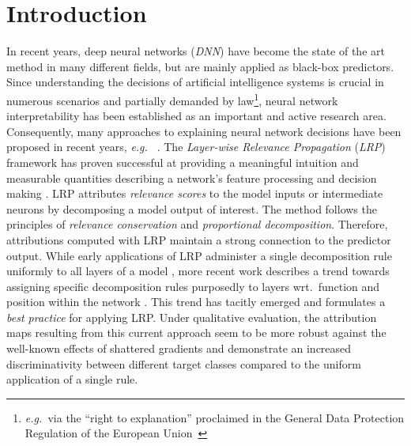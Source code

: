 \documentclass[conference]{IEEEtran}
\def\eg{\emph{e.g.~}}
\def\wrt{wrt.~}
\begin{document}
\section{Introduction}
In recent years, deep neural networks (\emph{DNN}) have become the state of the art method in many different fields,
but are mainly applied as black-box predictors.
Since understanding the decisions of artificial intelligence systems is crucial in numerous scenarios and partially demanded by law\footnote{\eg via the ``right to explanation'' proclaimed in the General Data Protection Regulation of the European Union~\cite{GDPR2016,goodman2016european}},
neural network interpretability has been established as an important and active research area.
Consequently, many approaches to explaining neural network decisions have been proposed in recent years,
\eg
\cite{springenberg2014striving,kindermans2017learning,sundararajan2017axiomatic,smilkov2017smoothgrad}.
The \emph{Layer-wise Relevance Propagation} (\emph{LRP}) \cite{bach2015pixel} framework has proven successful at providing a meaningful intuition and measurable quantities describing a network's feature processing and decision making
\cite{yang2018explaining, thomas2018analyzing,lapuschkin2019unmasking}.
LRP attributes \emph{relevance scores}  to the model inputs or intermediate neurons  by decomposing a model output of interest.
The method follows the principles of \emph{relevance conservation} and \emph{proportional decomposition}.
Therefore, attributions computed with LRP maintain a strong connection to the predictor output.
While early applications of LRP administer a single decomposition rule uniformly to all layers of a model
\cite{bach2015pixel,lapuschkin2016analyzing, ancona2019gradient}, more recent work describes a trend towards assigning specific decomposition rules purposedly to layers \wrt function and position within the network
\cite{montavon2019layer, lapuschkin2019unmasking, lapuschkin2017understanding, hagele2019resolving, hui2019batchnorm}.
This trend has tacitly emerged and formulates a \emph{best practice} for applying LRP.
Under qualitative evaluation, the attribution maps resulting from this current approach seem to be more robust against the well-known effects of
shattered gradients
\cite{ancona2019gradient,balduzzi2017shattered,montavon2019layer}
and demonstrate an increased discriminativity between different target classes
\cite{montavon2019layer, lapuschkin2017understanding}
compared to the uniform application of a single rule.
\end{document}
